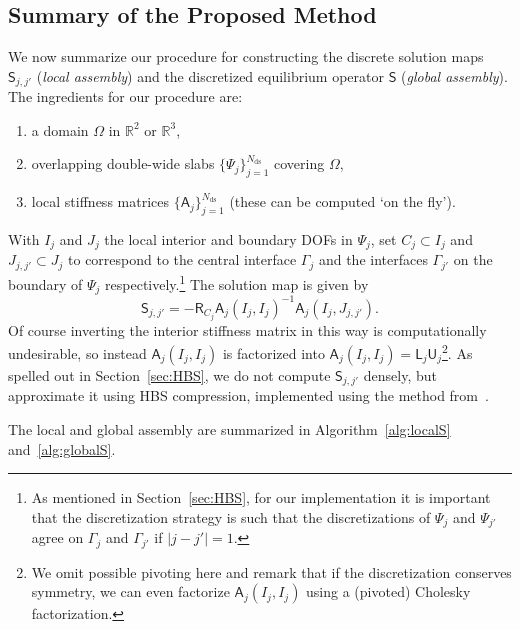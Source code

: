 \documentclass[final,onefignum,onetabnum]{siamart250211}
\newcommand{\mtx}[1]{\bm{\mathsf{#1}}}
\theoremstyle{definition}
\begin{document}
\subsection{Summary of the Proposed Method}
We now summarize our procedure for constructing the discrete solution maps $\mtx{S}_{j,j'}$ (\textit{local assembly}) and the discretized equilibrium operator $\mtx{S}$ (\textit{global assembly}). The ingredients for our procedure are:
\begin{enumerate}
    \item a domain $\Omega$ in $\mathbb{R}^2$ or $\mathbb{R}^3$,
    \item overlapping double-wide slabs $\{\Psi_j\}_{j=1}^{N_{\text{ds}}}$ covering $\Omega$,
    \item local stiffness matrices $\{\mtx{A}_j\}_{j=1}^{N_{\text{ds}}}$ (these can be computed `on the fly').
\end{enumerate}
With $I_j$ and $J_j$ the local interior and boundary DOFs in $\Psi_j$, set $C_j\subset I_j$ and $J_{j,j'}\subset J_j$ to correspond to the central interface $\Gamma_j$ and the interfaces $\Gamma_{j'}$ on the boundary of $\Psi_j$ respectively.\footnote{As mentioned in Section~\ref{sec:HBS}, for our implementation it is important that the discretization strategy is such that the discretizations of $\Psi_j$ and $\Psi_{j'}$ agree on $\Gamma_j$ and $\Gamma_{j'}$ if $|j-j'|=1$.} The solution map is given by
$$\mtx{S}_{j,j'} = -\mtx{R}_{C_j}\mtx{A}_j(I_j,I_j)^{-1}\mtx{A}_j(I_j,J_{j,j'}).$$
Of course inverting the interior stiffness matrix in this way is computationally undesirable, so instead $\mtx{A}_j(I_j,I_j)$ is factorized into $\mtx{A}_j(I_j,I_j) = \mtx{L}_j\mtx{U}_j$\footnote{We omit possible pivoting here and remark that if the discretization conserves symmetry, we can even factorize $\mtx{A}_j(I_j,I_j)$ using a (pivoted) Cholesky factorization.}. As spelled out in Section~\ref{sec:HBS}, we do not compute $\mtx{S}_{j,j'}$ densely, but approximate it using HBS compression, implemented using the method from~\cite{fastHBS}.

The local and global assembly are summarized in Algorithm~\ref{alg:localS} and~\ref{alg:globalS}.
\end{document}

